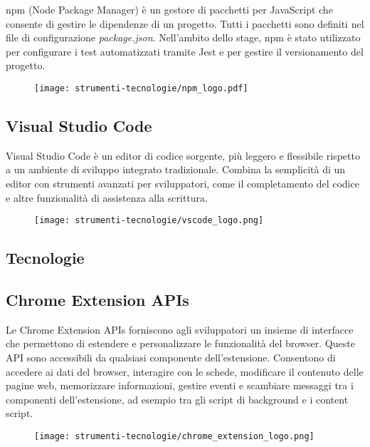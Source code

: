 \par npm (Node Package Manager) è un gestore di pacchetti per JavaScript che consente di gestire le dipendenze di un progetto. Tutti i pacchetti sono definiti nel file di configurazione \textit{package.json}. Nell’ambito dello stage, npm è stato utilizzato per configurare i test automatizzati tramite Jest e per gestire il versionamento del progetto.

\begin{figure}[H]
    \centering 
    \texttt{[image: strumenti-tecnologie/npm\_logo.pdf]} 
\end{figure}

\subsection*{Visual Studio Code}

\par Visual Studio Code è un editor di codice sorgente, più leggero e flessibile rispetto a un ambiente di sviluppo integrato tradizionale. Combina la semplicità di un editor con strumenti avanzati per sviluppatori, come il completamento del codice e altre funzionalità di assistenza alla scrittura.

\begin{figure}[H]
    \centering 
    \texttt{[image: strumenti-tecnologie/vscode\_logo.png]} 
\end{figure}

\subsection{Tecnologie}

\subsection*{Chrome Extension APIs}

\par Le Chrome Extension APIs forniscono agli sviluppatori un insieme di interfacce che permettono di estendere e personalizzare le funzionalità del browser. Queste API sono accessibili da qualsiasi componente dell’estensione. Consentono di accedere ai dati del browser, interagire con le schede, modificare il contenuto delle pagine web, memorizzare informazioni, gestire eventi e scambiare messaggi tra i componenti dell’estensione, ad esempio tra gli script di background e i content script.

\begin{figure}[H]
    \centering 
    \texttt{[image: strumenti-tecnologie/chrome\_extension\_logo.png]} 
\end{figure}


